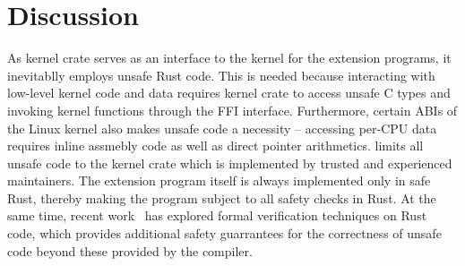 \section{Discussion}

As \projname{} kernel crate serves as an interface to the kernel for the
    extension programs, it inevitablly employs unsafe Rust code.
This is needed because interacting with low-level kernel code and data requires
    kernel crate to access unsafe C types and invoking kernel functions through
    the FFI interface.
Furthermore, certain ABIs of the Linux kernel also makes unsafe code a
    necessity -- accessing per-CPU data requires inline assmebly code as well
    as direct pointer arithmetics.
\projname{} limits all unsafe code to the kernel crate which is implemented by
    trusted and experienced maintainers.
The extension program itself is always implemented only in safe Rust, thereby
    making the program subject to all safety checks in Rust.
At the same time, recent work~\cite{verus} has explored formal verification
    techniques on Rust code, which provides additional safety guarrantees
    for the correctness of unsafe code beyond these provided by the compiler.

